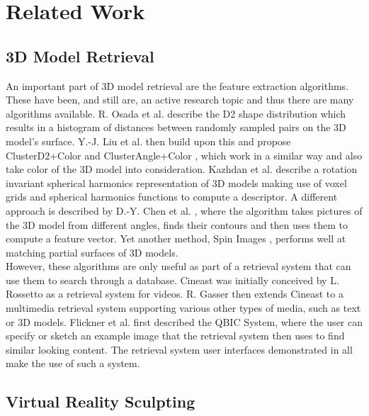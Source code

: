 \chapter{Related Work}

\section{3D Model Retrieval}

An important part of 3D model retrieval are the feature extraction algorithms. These have been, and still are, an active research topic and thus there are many algorithms available. R. Osada et al. describe the D2 shape distribution \cite{d2_shape_distribution} which results in a histogram of distances between randomly sampled pairs on the 3D model's surface. Y.-J. Liu et al. then build upon this and propose ClusterD2+Color and ClusterAngle+Color \cite{cluster_d2_color}, which work in a similar way and also take color of the 3D model into consideration. Kazhdan et al. describe a rotation invariant spherical harmonics representation of 3D models \cite{spherical_harmonics} making use of voxel grids and spherical harmonics functions to compute a descriptor. A different approach is described by D.-Y. Chen et al. \cite{lightfield_descriptor}, where the algorithm takes pictures of the 3D model from different angles, finds their contours and then uses them to compute a feature vector. Yet another method, Spin Images \cite{spin_descriptor}, performs well at matching partial surfaces of 3D models.\\
However, these algorithms are only useful as part of a retrieval system that can use them to search through a database. Cineast was initially conceived by L. Rossetto \cite{cineast_rossetto} as a retrieval system for videos. R. Gasser then extends Cineast to a multimedia retrieval system \cite{cineast_gasser} supporting various other types of media, such as text or 3D models. Flickner et al. \cite{qbic_system} first described the QBIC System, where the user can specify or sketch an example image that the retrieval system then uses to find similar looking content. The retrieval system user interfaces demonstrated in \cite{cineast_gasser, 3d_model_retrieval_vranic, cluster_d2_color} all make the use of such a system.

\section{Virtual Reality Sculpting}

